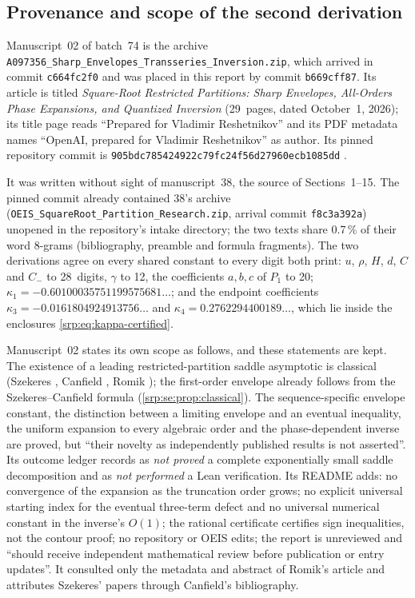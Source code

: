 \documentclass[11pt,a4paper]{article}
\numberwithin{equation}{section}
\theoremstyle{definition}
\theoremstyle{remark}
\begin{document}
\subsection{Provenance and scope of the second derivation}
\label{srp:se:sec:provenance}

Manuscript~02 of batch~74 is the archive
\nolinkurl{A097356_Sharp_Envelopes_Transseries_Inversion.zip}, which
arrived in commit \texttt{c664fc2f0} and was placed in this report by
commit \texttt{b669cff87}. Its article is titled \emph{Square-Root
Restricted Partitions: Sharp Envelopes, All-Orders Phase Expansions, and
Quantized Inversion} (29~pages, dated October~1, 2026); its title page
reads ``Prepared for Vladimir Reshetnikov'' and its PDF metadata names
``OpenAI, prepared for Vladimir Reshetnikov'' as author. Its pinned
repository commit is
\nolinkurl{905bdc785424922c79fc24f56d27960ecb1085dd} \cite{seProveIt}.

It was written without sight of manuscript~38, the source of
Sections~1--15. The pinned commit already contained 38's archive
(\texttt{OEIS\_SquareRoot\_Partition\_Research.zip}, arrival commit
\texttt{f8c3a392a}) unopened in the repository's intake directory; the two
texts share 0.7\,\% of their word 8-grams (bibliography, preamble and
formula fragments). The two derivations agree on every shared constant to
every digit both print: $u$, $\rho$, $H$, $d$, $C$ and $C_-$ to 28~digits,
$\gamma$ to 12, the coefficients $a,b,c$ of $P_1$ to 20;
$\kappa_1=-0.60100035751199575681\ldots$; and the endpoint coefficients
$\kappa_3=-0.0161804924913756\ldots$ and $\kappa_4=0.2762294400189\ldots$,
which lie inside the enclosures \eqref{srp:eq:kappa-certified}.

Manuscript~02 states its own scope as follows, and these statements are
kept. The existence of a leading restricted-partition saddle asymptotic is
classical (Szekeres \cite{seSzekeresI,seSzekeresII}, Canfield
\cite{canfield}, Romik \cite{romik}); the first-order envelope already
follows from the Szekeres--Canfield formula
(\cref{srp:se:prop:classical}). The sequence-specific envelope constant,
the distinction between a limiting envelope and an eventual inequality,
the uniform expansion to every algebraic order and the phase-dependent
inverse are proved, but ``their novelty as independently published
results is not asserted''. Its outcome ledger records as \emph{not proved}
a complete exponentially small saddle decomposition and as \emph{not
performed} a Lean verification. Its README adds: no convergence of the
expansion as the truncation order grows; no explicit universal starting
index for the eventual three-term defect and no universal numerical
constant in the inverse's $O(1)$; the rational certificate certifies sign
inequalities, not the contour proof; no repository or OEIS edits; the
report is unreviewed and ``should receive independent mathematical review
before publication or entry updates''. It consulted only the metadata and
abstract of Romik's article and attributes Szekeres' papers through
Canfield's bibliography.
\end{document}
